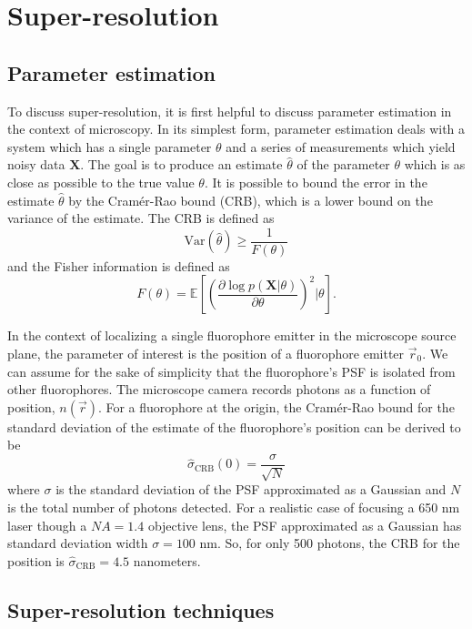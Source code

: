 \documentclass[12pt]{article}
\begin{document}
\section{Super-resolution}

\subsection{Parameter estimation}

To discuss super-resolution, it is first helpful to discuss parameter estimation in the context of microscopy. In its simplest form, parameter estimation deals with a system which has a single parameter $\theta$ and a series of measurements which yield noisy data $\mathbf{X}$. The goal is to produce an estimate $\hat{\theta}$ of the parameter $\theta$ which is as close as possible to the true value $\theta$. It is possible to bound the error in the estimate $\hat{\theta}$ by the Cramér-Rao bound (CRB), which is a lower bound on the variance of the estimate. The CRB is defined as 
\[
\text{Var}(\hat{\theta}) \geq \frac{1}{F(\theta)}
\]
and the Fisher information is defined as
\[
F(\theta) = \mathbb{E}\left[\left(\frac{\partial \log p(\mathbf{X}|\theta)}{\partial \theta}\right)^2 \Big| \theta\right].
\]

In the context of localizing a single fluorophore emitter in the microscope source plane, the parameter of interest is the position of a fluorophore emitter $\vec r_0$. We can assume for the sake of simplicity that the fluorophore's PSF is isolated from other fluorophores. The microscope camera records photons as a function of position, $n(\vec r)$. For a fluorophore at the origin, the Cramér-Rao bound for the standard deviation of the estimate of the fluorophore's position can be derived to be $$\hat \sigma_{\text{CRB}}(0) = \frac{\sigma}{\sqrt{N}}$$ where $\sigma$ is the standard deviation of the PSF approximated as a Gaussian and $N$ is the total number of photons detected. For a realistic case of focusing a 650 nm laser though a $NA=1.4$ objective lens, the PSF approximated as a Gaussian has standard deviation width $\sigma = 100$ nm. So, for only 500 photons, the CRB for the position is $\hat \sigma_{\text{CRB}} = 4.5$ nanometers.

\subsection{Super-resolution techniques}
\end{document}

